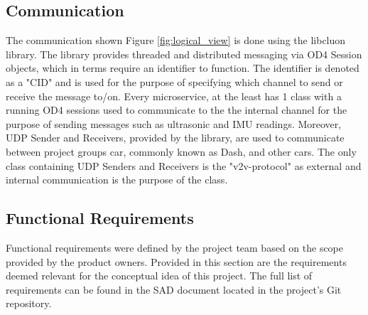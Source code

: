 \documentclass[12pt]{article}
\begin{document}
\subsection{Communication} 
The communication shown Figure \ref{fig:logical_view} is done using the libcluon\cite{libcluon} library. The library provides threaded and distributed messaging via OD4 Session objects, which in terms require an identifier to function. The identifier is denoted as a "CID" and is used for the purpose of specifying which channel to send or receive the message to/on. Every microservice, at the least has 1 class with a running OD4 sessions used to communicate to the the internal channel for the purpose of sending messages such as ultrasonic and IMU readings. Moreover, UDP Sender and Receivers, provided by the library, are used to communicate between project groups car, commonly known as Dash, and other cars. The only class containing UDP Senders and Receivers is the "v2v-protocol" as external and internal communication is the purpose of the class.
\subsection{Functional Requirements}
Functional requirements were defined by the project team based on the scope provided by the product owners. Provided in this section are the requirements deemed relevant for the conceptual idea of this project. The full list of requirements can be found in the SAD document \cite{SAD} located in the project's Git repository. 
\end{document}
